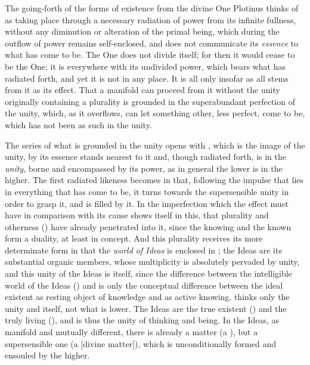 The going-forth of the forms of existence from the divine One Plotinus
thinks of as taking place through a necessary radiation of power from
its infinite fullness, without any diminution or alteration of the
primal being, which during the outflow of power remains self-enclosed,
and does not communicate its \emph{essence} to what has come to be. The
One does not divide itself; for then it would cease to be the One; it
is everywhere with its undivided power, which bears what has radiated
forth, and yet it is not in any place. It is all only insofar as all
stems from it as its effect. That a manifold can proceed from it
without the unity originally containing a plurality is grounded in the
superabundant perfection of the unity, which, as it overflows, can let
something other, less perfect, come to be, which has not been as such
in the unity.

The series of what is grounded in the unity opens with , which
is the image of the unity, by its essence stands nearest to it and,
though radiated forth, is in the \emph{unity}, borne and encompassed by
its power, as in general the lower is in the higher. The first
radiated likeness becomes  in that, following the impulse that
lies in everything that has come to be, it turns towards the
supersensible unity in order to grasp it, and is filled by it. In
 the imperfection which the effect must have in comparison with
its cause shows itself in this, that plurality and otherness
() have already penetrated into it, since the knowing and
the known form a duality, at least in concept. And this plurality
receives its more determinate form in that the \emph{world of Ideas} is
enclosed in ; the Ideas are its substantial organic members,
whose multiplicity is absolutely pervaded by unity, and this unity of
the Ideas is  itself, since the difference between the
intelligible world of the Ideas () and  is only
the conceptual difference between the
ideal existent as resting object of knowledge and as active
knowing.  thinks only the unity and itself, not what is lower.
The Ideas are the true existent () and the truly living
(), and  is thus the unity of thinking and
being. In the Ideas, as manifold and mutually different, there is
already a matter (a ), but a supersensible one (a  [divine matter]),
which is unconditionally formed and ensouled by the higher.

